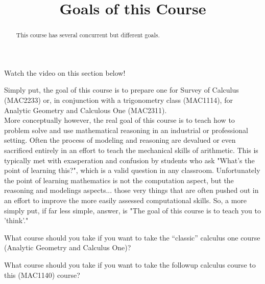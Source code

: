\documentclass{ximera}
\title{Goals of this Course}
\begin{document}
\begin{abstract}
This course has several concurrent but different goals.
\end{abstract}
\maketitle

Watch the video on this section below!


Simply put, the goal of this course is to prepare one for Survey of Calculus (MAC2233) or, in conjunction with a trigonometry class (MAC1114), for Analytic Geometry and Calculous One (MAC2311). \\

More conceptually however, the real goal of this course is to teach how to problem solve and use mathematical reasoning in an industrial or professional setting. Often the process of modeling and reasoning are devalued or even sacrificed entirely in an effort to teach the mechanical skills of arithmetic. This is typically met with exasperation and confusion by students who ask "What's the point of learning this?", which is a valid question in any classroom. Unfortunately the point of learning mathematics is not the computation aspect, but the reasoning and modelings aspects... those very things that are often pushed out in an effort to improve the more easily assessed computational skills. So, a more simply put, if far less simple, answer, is "The goal of this course is to teach you to 'think'." 


\begin{problem}
    What course should you take if you want to take the ``classic'' calculus one course (Analytic Geometry and Calculus One)?
    \begin{multipleChoice}
    \end{multipleChoice}
\end{problem}

\begin{problem}
    What course should you take if you want to take the followup calculus course to this (MAC1140) course? 
    \begin{multipleChoice}
    \end{multipleChoice}
\end{problem}
\end{document}
